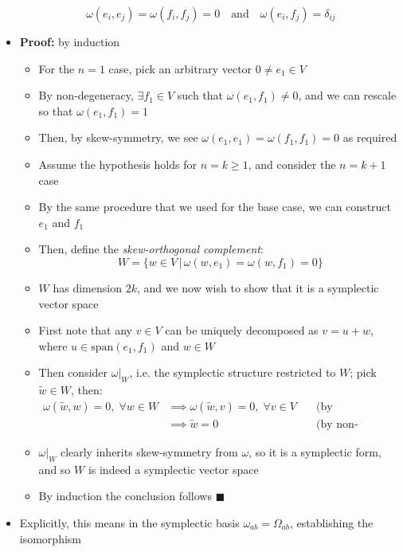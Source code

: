 \documentclass[12pt,a4paper]{article}
\numberwithin{equation}{section}
\begin{document}
\begin{itemize}
		\begin{equation}
			\omega(e_{i},e_{j})=\omega(f_{i},f_{j})=0\quad\text{and}\quad\omega(e_{i},f_{j})=\delta_{ij}
		\end{equation}
		\item \textbf{Proof:} by induction
		\begin{itemize}
			\item For the $n=1$ case, pick an arbitrary vector $0\neq e_{1}\in V$
			\item By non-degeneracy, $\exists f_{1}\in V$ such that $\omega(e_{1},f_{1})\neq 0$, and we can rescale so that $\omega(e_{1},f_{1})=1$
			\item Then, by skew-symmetry, we see $\omega(e_{1},e_{1})=\omega(f_{1},f_{1})=0$ as required
			\item Assume the hypothesis holds for $n=k\geq1$, and consider the $n=k+1$ case
			\item By the same procedure that we used for the base case, we can construct $e_{1}$ and $f_{1}$
			\item Then, define the \textit{skew-orthogonal complement}:
			\begin{equation}
				W=\{w\in V\,|\,\omega(w,e_{1})=\omega(w,f_{1})=0\}
			\end{equation}
			\item $W$ has dimension $2k$, and we now wish to show that it is a symplectic vector space
			\item First note that any $v\in V$ can be uniquely decomposed as $v=u+w$, where $u\in\text{span}(e_{1},f_{1})$ and $w\in W$
			\item Then consider $\omega|_{W}$, i.e. the symplectic structure restricted to $W$; pick $\tilde{w}\in W$, then:
			\begin{equation}
				\begin{aligned}
					\omega(\tilde{w},w)=0,\;\forall w\in W &\implies \omega(\tilde{w},v)=0, \;\forall v\in V \quad&\text{(by decomposition above)}\\
					&\implies \tilde{w}=0\quad&\text{(by non-degeneracy)}
				\end{aligned}
			\end{equation}
			\item $\omega|_{W}$ clearly inherits skew-symmetry from $\omega$, so it is a symplectic form, and so $W$ is indeed a symplectic vector space
			\item By induction the conclusion follows $\blacksquare$
		\end{itemize}
		\item Explicitly, this means in the symplectic basis $\omega_{ab}=\Omega_{ab}$, establishing the isomorphism 

\end{itemize}
\end{document}
